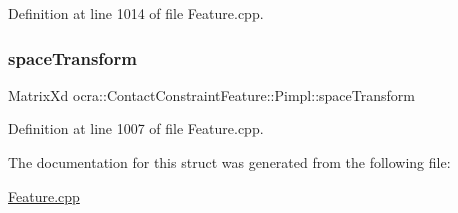 Definition at line 1014 of file Feature.\+cpp.

\hypertarget{structocra_1_1ContactConstraintFeature_1_1Pimpl_a3b33ee6094ed308df598785b4a75416c}{}\label{structocra_1_1ContactConstraintFeature_1_1Pimpl_a3b33ee6094ed308df598785b4a75416c} 
\subsubsection{\texorpdfstring{space\+Transform}{spaceTransform}}
{\footnotesize\ttfamily Matrix\+Xd ocra\+::\+Contact\+Constraint\+Feature\+::\+Pimpl\+::space\+Transform}



Definition at line 1007 of file Feature.\+cpp.



The documentation for this struct was generated from the following file\+:\begin{DoxyCompactItemize}
\item 
\hyperlink{Feature_8cpp}{Feature.\+cpp}\end{DoxyCompactItemize}

